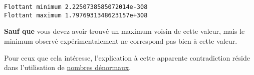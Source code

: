     \begin{Verbatim}[commandchars=\\\{\},frame=single,framerule=0.3mm,rulecolor=\color{cellframecolor}]
Flottant minimum 2.2250738585072014e-308
Flottant maximum 1.7976931348623157e+308
\end{Verbatim}

    \textbf{Sauf que} vous devez avoir trouvé un maximum voisin de cette
valeur, mais le minimum observé expérimentalement ne correspond pas bien
à cette valeur.

Pour ceux que cela intéresse, l'explication à cette apparente
contradiction réside dans l'utilisation de
\href{http://en.wikipedia.org/wiki/Denormal\%5Fnumber}{nombres
dénormaux}.


    
    
    
